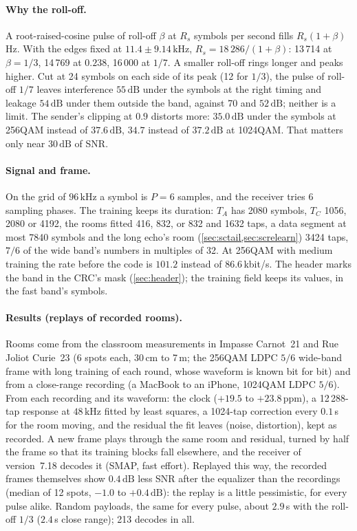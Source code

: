 \documentclass[11pt,a4paper]{article}
\newcommand{\kHz}{\,\mathrm{kHz}}
\newcommand{\dB}{\,\mathrm{dB}}
\theoremstyle{remark}
\begin{document}
\paragraph{Why the roll-off.}
A root-raised-cosine pulse of roll-off $\beta$ at $R_s$ symbols per second fills $R_s(1 + \beta)$\,Hz. With the edges fixed at $11.4 \pm 9.14\kHz$, $R_s = 18\,286/(1 + \beta)$: 13\,714 at $\beta = 1/3$, 14\,769 at $0.238$, 16\,000 at $1/7$. A smaller roll-off rings longer and peaks higher. Cut at 24 symbols on each side of its peak (12 for $1/3$), the pulse of roll-off $1/7$ leaves interference $55\dB$ under the symbols at the right timing and leakage $54\dB$ under them outside the band, against 70 and $52\dB$; neither is a limit. The sender's clipping at $0.9$ distorts more: $35.0\dB$ under the symbols at 256QAM instead of $37.6\dB$, $34.7$ instead of $37.2\dB$ at 1024QAM. That matters only near $30\dB$ of SNR.

\paragraph{Signal and frame.}
On the grid of $96\kHz$ a symbol is $P = 6$ samples, and the receiver tries 6 sampling phases. The training keeps its duration: $T_A$ has 2080 symbols, $T_C$ 1056, 2080 or 4192, the rooms fitted 416, 832, or 832 and 1632 taps, a data segment at most 7840 symbols and the long echo's room (\cref{sec:sctail,sec:screlearn}) 3424 taps, $7/6$ of the wide band's numbers in multiples of 32. At 256QAM with medium training the rate before the code is $101.2$ instead of $86.6$\,kbit/s. The header marks the band in the CRC's mask (\cref{sec:header}); the training field keeps its values, in the fast band's symbols.

\paragraph{Results (replays of recorded rooms).}
Rooms come from the classroom measurements in Impasse Carnot~21 and Rue Joliot Curie~23 (6 spots each, $30\,\mathrm{cm}$ to 7\,m; the 256QAM LDPC $5/6$ wide-band frame with long training of each round, whose waveform is known bit for bit) and from a close-range recording (a MacBook to an iPhone, 1024QAM LDPC $5/6$). From each recording and its waveform: the clock ($+19.5$ to $+23.8$\,ppm), a 12\,288-tap response at $48\kHz$ fitted by least squares, a 1024-tap correction every $0.1$\,s for the room moving, and the residual the fit leaves (noise, distortion), kept as recorded. A new frame plays through the same room and residual, turned by half the frame so that its training blocks fall elsewhere, and the receiver of version~7.18 decodes it (SMAP, fast effort). Replayed this way, the recorded frames themselves show $0.4\dB$ less SNR after the equalizer than the recordings (median of 12 spots, $-1.0$ to $+0.4\dB$): the replay is a little pessimistic, for every pulse alike. Random payloads, the same for every pulse, about $2.9$\,s with the roll-off $1/3$ ($2.4$\,s close range); 213 decodes in all.
\end{document}
